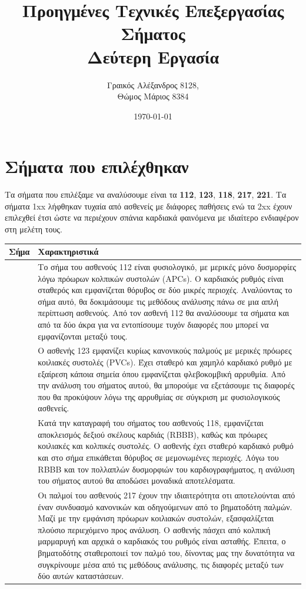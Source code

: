 \documentclass[11pt,a4paper]{article}
\title{Προηγμένες Τεχνικές Επεξεργασίας Σήματος\\Δεύτερη Εργασία}
\author{Γραικός Αλέξανδρος 8128, \\Θώμος Μάριος 8384}
\date{\today}
\begin{document}
\maketitle

\section*{Σήματα που επιλέχθηκαν}
Τα σήματα που επιλέξαμε να αναλύσουμε είναι τα \textbf{112}, \textbf{123}, \textbf{118}, \textbf{217}, \textbf{221}. Τα σήματα 1xx λήφθηκαν τυχαία από ασθενείς με διάφορες παθήσεις ενώ τα 2xx έχουν επιλεχθεί έτσι ώστε να περιέχουν σπάνια καρδιακά φαινόμενα με ιδιαίτερο ενδιαφέρον στη μελέτη τους.

\begin{center}
\begin{tabular}{| >{\centering\arraybackslash}m{1cm} | >{\centering\arraybackslash}m{15cm}|} 
 \hline
 Σήμα & Χαρακτηριστικά \\ 
 \hline 
 112 &  Το σήμα του ασθενούς 112 είναι φυσιολογικό, με μερικές μόνο δυσμορφίες λόγω πρόωρων κολπικών συστολών (APCs). Ο καρδιακός ρυθμός είναι σταθερός και εμφανίζεται θόρυβος σε δύο μικρές περιοχές. Αναλύοντας το σήμα αυτό, θα δοκιμάσουμε τις μεθόδους ανάλυσης πάνω σε μια απλή περίπτωση ασθενούς. Από τον ασθενή 112 θα αναλύσουμε τα σήματα και από τα δύο άκρα για να εντοπίσουμε τυχόν διαφορές που μπορεί να εμφανίζονται μεταξύ τους. \\
 \hline
 123 & Ο ασθενής 123 εμφανίζει κυρίως κανονικούς παλμούς με μερικές πρόωρες κοιλιακές συστολές (PVCs). Έχει σταθερό και χαμηλό καρδιακό ρυθμό με εξαίρεση κάποια σημεία όπου εμφανίζεται φλεβοκομβική αρρυθμία. Από την ανάλυση του σήματος αυτού, θα μπορούμε να εξετάσουμε τις διαφορές που θα προκύψουν λόγω της αρρυθμίας σε σύγκριση με φυσιολογικούς ασθενείς. \\
 \hline
 118 & Κατά την καταγραφή του σήματος του ασθενούς 118, εμφανίζεται αποκλεισμός δεξιού σκέλους καρδιάς (RBBB), καθώς και πρόωρες κοιλιακές και κολπικές συστολές. Ο ασθενής έχει σταθερό καρδιακό ρυθμό και στο σήμα επικάθεται θόρυβος σε μεμονωμένες περιοχές. Λόγω του RBBB και τον πολλαπλών δυσμορφιών του καρδιογραφήματος, η ανάλυση του σήματος αυτού θα αποδώσει μοναδικά αποτελέσματα. \\
 \hline
 217 & Οι παλμοί του ασθενούς 217 έχουν την ιδιαιτερότητα οτι αποτελούνται από έναν συνδυασμό κανονικών και οδηγούμενων από το βηματοδότη παλμών. Μαζί με την εμφάνιση πρόωρων κοιλιακών συστολών, εξασφαλίζεται πλούσιο περιεχόμενο προς ανάλυση. Ο ασθενής πάσχει από κολπική μαρμαρυγή και αρχικά ο καρδιακός του ρυθμός είναι ασταθής. Έπειτα, ο βηματοδότης σταθεροποιεί τον παλμό του, δίνοντας μας την δυνατότητα να συγκρίνουμε μέσα από τις μεθόδους ανάλυσης, τις διαφορές μεταξύ των δύο αυτών καταστάσεων. \\

\end{tabular}
\end{center}
\end{document}

